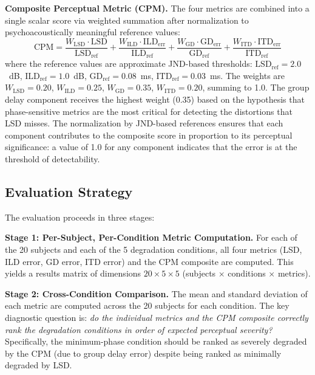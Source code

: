 \documentclass[12pt,a4paper]{article}
\begin{document}
\textbf{Composite Perceptual Metric (CPM).}
The four metrics are combined into a single scalar score via weighted summation after normalization to psychoacoustically meaningful reference values:
\begin{equation}
\mathrm{CPM} = \frac{W_{\mathrm{LSD}} \cdot \mathrm{LSD}}{\mathrm{LSD}_{\mathrm{ref}}} + \frac{W_{\mathrm{ILD}} \cdot \mathrm{ILD}_{\mathrm{err}}}{\mathrm{ILD}_{\mathrm{ref}}} + \frac{W_{\mathrm{GD}} \cdot \mathrm{GD}_{\mathrm{err}}}{\mathrm{GD}_{\mathrm{ref}}} + \frac{W_{\mathrm{ITD}} \cdot \mathrm{ITD}_{\mathrm{err}}}{\mathrm{ITD}_{\mathrm{ref}}}
\label{eq:cpm}
\end{equation}
where the reference values are approximate JND-based thresholds: $\mathrm{LSD}_{\mathrm{ref}} = 2.0$~dB, $\mathrm{ILD}_{\mathrm{ref}} = 1.0$~dB, $\mathrm{GD}_{\mathrm{ref}} = 0.08$~ms, $\mathrm{ITD}_{\mathrm{ref}} = 0.03$~ms. The weights are $W_{\mathrm{LSD}} = 0.20$, $W_{\mathrm{ILD}} = 0.25$, $W_{\mathrm{GD}} = 0.35$, $W_{\mathrm{ITD}} = 0.20$, summing to 1.0. The group delay component receives the highest weight (0.35) based on the hypothesis that phase-sensitive metrics are the most critical for detecting the distortions that LSD misses. The normalization by JND-based references ensures that each component contributes to the composite score in proportion to its perceptual significance: a value of 1.0 for any component indicates that the error is at the threshold of detectability.

\subsection{Evaluation Strategy}

The evaluation proceeds in three stages:

\textbf{Stage 1: Per-Subject, Per-Condition Metric Computation.}
For each of the 20 subjects and each of the 5 degradation conditions, all four metrics (LSD, ILD error, GD error, ITD error) and the CPM composite are computed. This yields a results matrix of dimensions $20 \times 5 \times 5$ (subjects $\times$ conditions $\times$ metrics).

\textbf{Stage 2: Cross-Condition Comparison.}
The mean and standard deviation of each metric are computed across the 20 subjects for each condition. The key diagnostic question is: \textit{do the individual metrics and the CPM composite correctly rank the degradation conditions in order of expected perceptual severity?} Specifically, the minimum-phase condition should be ranked as severely degraded by the CPM (due to group delay error) despite being ranked as minimally degraded by LSD.
\end{document}
